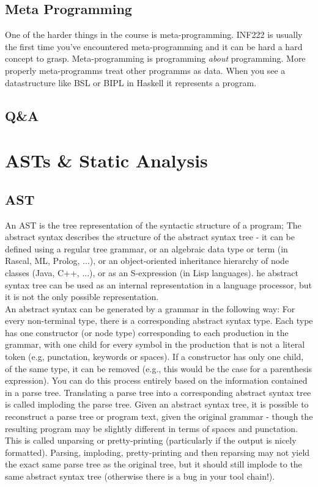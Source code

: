 \documentclass{article}
\begin{document}
    \subsection{Meta Programming}
    One of the harder things in the course is \gls{meta-programming}. INF222 is usually the first time you've encountered meta-programming and it can be hard a hard concept to grasp. 
    Meta-programming is programming \textit{about} programming. More properly meta-programms treat other programms as data. When you see a datastructure like \gls{BSL} or \gls{BIPL} in Haskell it
    represents a program.

    \subsection{Q\&A}

    \section{ASTs \& Static Analysis}
        \subsection{AST}
        An \gls{AST} is the tree representation of the syntactic structure of a program; The abstract syntax
        describes the structure of the abstract syntax tree - it can be defined using a
        regular tree grammar, or an algebraic data type or term (in Rascal, ML, Prolog,
        ...), or an object-oriented inheritance hierarchy of node classes (Java, C++, ...),
        or as an S-expression (in Lisp languages).
        he abstract syntax tree can be used as an internal representation in a language processor, 
        but it is not the only possible representation.\\
        An abstract syntax can be generated by a grammar in the following way:
        For every non-terminal type, there is a corresponding abstract syntax type.
        Each type has one constructor (or node type) corresponding to each production in the grammar, with one child for every symbol in the production that
        is not a literal token (e.g, punctation, keywords or spaces). If a constructor
        has only one child, of the same type, it can be removed (e.g., this would be
        the case for a parenthesis expression). You can do this process entirely based
        on the information contained in a parse tree. Translating a parse tree into a
        corresponding abstract syntax tree is called imploding the parse tree.
        Given an abstract syntax tree, it is possible to reconstruct a parse tree or program text, given the original grammar - though the resulting program may be
        slightly different in terms of spaces and punctation. This is called unparsing or
        pretty-printing (particularly if the output is nicely formatted). Parsing, imploding, pretty-printing and then reparsing may not yield the exact same parse tree
        as the original tree, but it should still implode to the same abstract syntax tree (otherwise there is a bug in your tool chain!).
\end{document}
